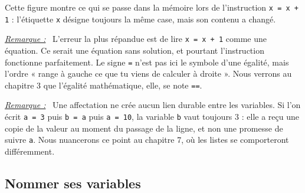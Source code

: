 \documentclass[a4paper,11pt,openany]{book}
\newcommand{\code}[1]{\texttt{\textcolor{codebleu}{#1}}}
\newenvironment{remarque}%
 {\par\vspace{1mm}\begin{list}{}{\leftmargin=1cm \rightmargin=0.5cm}\item[]%
  \textit{\underline{Remarque :}}~}%
 {\end{list}\vspace{1mm}}
\begin{document}
\begin{center}
\end{center}

Cette figure montre ce qui se passe dans la mémoire lors de l'instruction \code{x = x + 1} : l'étiquette \code{x} désigne toujours la même case, mais son contenu a changé.

\begin{remarque}
L'erreur la plus répandue est de lire \code{x = x + 1} comme une équation. Ce serait une équation sans solution, et pourtant l'instruction fonctionne parfaitement. Le signe \code{=} n'est pas ici le symbole d'une égalité, mais l'ordre « range à gauche ce que tu viens de calculer à droite ». Nous verrons au chapitre 3 que l'égalité mathématique, elle, se note \code{==}.
\end{remarque}

\begin{remarque}
Une affectation ne crée aucun lien durable entre les variables. Si l'on écrit \code{a = 3} puis \code{b = a} puis \code{a = 10}, la variable \code{b} vaut toujours $3$ : elle a reçu une copie de la valeur au moment du passage de la ligne, et non une promesse de suivre \code{a}. Nous nuancerons ce point au chapitre 7, où les listes se comporteront différemment.
\end{remarque}

\subsection{Nommer ses variables}
\end{document}
